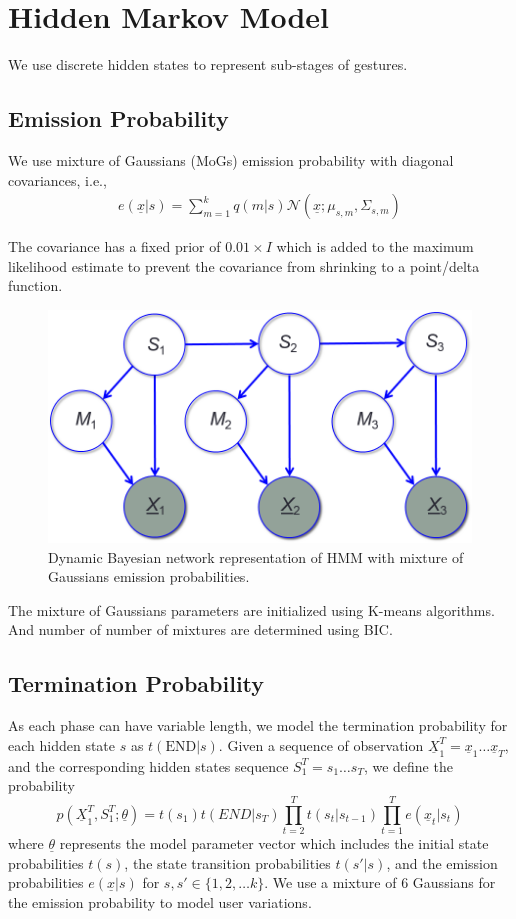 \section{Hidden Markov Model}
We use discrete hidden states to represent sub-stages of gestures.

\subsection{Emission Probability}
We use mixture of Gaussians (MoGs) emission probability with diagonal
covariances, i.e.,
\begin{align}
e(\underline{x} | s) = \sum_{m=1}^k q(m | s)\mathcal{N}(\underline{x};
\mu_{s,m}, \Sigma_{s, m})
\end{align}

The covariance has a fixed prior of $0.01\times I$ which is added to the maximum likelihood
estimate to prevent the covariance from shrinking to a point/delta function.

\begin{figure}
\centering
\includegraphics[width=0.5\columnwidth]{figures/mog.png}
\caption{Dynamic Bayesian network representation of HMM with mixture of
Gaussians emission probabilities.}
\end{figure}

The mixture of Gaussians parameters are initialized using K-means algorithms.
And number of number of mixtures are determined using BIC.

\subsection{Termination Probability}
As each phase can have variable length, we model the termination probability for each
hidden state $s$ as $t(\text{END}|s)$. Given a sequence of observation $\underline{X}_1^T = \underline{x}_1\ldots\underline{x}_T$, and 
the corresponding hidden states sequence $S_1^T = s_1\ldots s_T$, we define the probability
\begin{displaymath}
p(\underline{X}_1^T, S_1^T;\underline{\theta}) = 
    t(s_1)t(END|s_T)\prod_{t = 2}^T t(s_t | s_{t-1})\prod_{t = 1}^T e(\underline{x}_t|s_t)
\end{displaymath}
where $\underline{\theta}$ represents the model parameter vector which includes
the initial state probabilities $t(s)$, the state transition probabilities $t(s'|s)$, and the 
emission probabilities $e(\underline{x}|s)$ for $s, s'\in \{1, 2,\ldots k\}$. 
We use a mixture of 6 Gaussians for the emission probability to model user variations.

